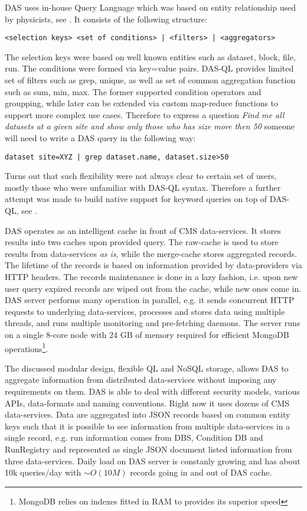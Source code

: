 DAS uses in-house Query Language which was based on entity relationship used by
physicists, see \cite{DAS}. It consists of the following structure:

\begin{verbatim}
<selection keys> <set of conditions> | <filters> | <aggregators>
\end{verbatim}

The selection keys were based on well known entities such as dataset, block, file,
run. The conditions were formed via key=value pairs. DAS-QL
provides limited set of filters such as grep, unique,
as well as set of common aggregation function such as
sum, min, max. The former supported condition operators and groupping, while
later can be extended via custom map-reduce functions to support more complex
use cases. Therefore to express a question {\it Find me all datasets at a
given site and show only those who has size more then 50} someone will need to
write a DAS query in the following way:

\begin{verbatim}
dataset site=XYZ | grep dataset.name, dataset.size>50
\end{verbatim}

Turns out that such flexibility were not always clear to certain set of users,
mostly those who were unfamiliar with DAS-QL syntax. Therefore a further
attempt was made to build native support for keyword queries on top of DAS-QL,
see \cite{DASKWS}.

DAS operates as an intelligent cache in front of CMS data-services. It stores
results into two caches upon provided query. The raw-cache is used to store results from
data-services {\it as is}, while the merge-cache stores aggregated
records. The lifetime of the records is based on information provided by
data-providers via HTTP headers. The records maintenance is done in a lazy
fashion, i.e. upon new user query expired records are wiped out from the cache,
while new ones come in. DAS server performs many operation in parallel, e.g.
it sends concurrent HTTP requests to underlying data-services, processes and
stores
data using multiple threads, and runs multiple monitoring and pre-fetching
daemons. The server runs on a single 8-core node with 24 GB of memory
required for efficient MongoDB operations\footnote{MongoDB relies on indexes
fitted in RAM to provides its superior speed}.

The discussed modular design, flexible QL and NoSQL storage, allows DAS to
aggregate information from distributed data-services without imposing any
requirements on them. DAS is able to deal with different security models,
various APIs, data-formats and naming conventions. Right now it uses dozens of CMS
data-services. Data are aggregated into JSON records based on common entity
keys such that it is possible to see information from multiple
data-services in a single record, e.g. run information comes from DBS, Condition DB and
RunRegistry and represented as single JSON document listed information from
three data-services. Daily load on DAS server is constanly growing and has about 10k
queries/day with $\sim O(10M)$ records going in and out of DAS cache.

